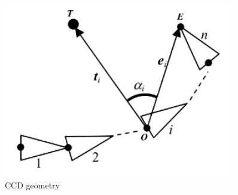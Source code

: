 \begin{figure}[ht]
	\centering
	\includegraphics[width=0.9\textwidth,]{figures/background/CCD-geometry.png}
	\caption{CCD geometry}
	\label{fig:background/CCD geometry}
\end{figure}

